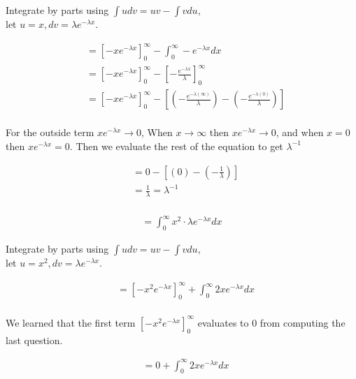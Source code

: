 \documentclass[twocolumn]{article}
\begin{document}
Integrate by parts using $\int udv  = uv - \int vdu$, \\let $u = x, dv=\lambda e^{-\lambda x}$.

\begin{align*}
	&= [-xe^{-\lambda x}]_{0}^{\infty} - \int_{0}^{\infty} -e^{-\lambda x} dx\\
	&= [-xe^{-\lambda x}]_{0}^{\infty} - [-\frac{e^{-\lambda x}}{\lambda} ]^{\infty}_{0}\\
	&= [-xe^{-\lambda x}]_{0}^{\infty} - [(-\frac{e^{-\lambda (\infty)}}{\lambda} ) - (-\frac{e^{-\lambda (0)}}{\lambda})] \\
\end{align*}

For the outside term $xe^{-\lambda x} \to 0$, When $x \to \infty$ then $xe^{-\lambda x} \to 0$, and when $x = 0$ then $x e^{-\lambda x} = 0$. Then we evaluate the rest of the equation to get $\lambda^{-1}$

\begin{align*}
	&= 0 -[(0) - (-\frac{1}{\lambda})] \\
	&= \frac{1}{\lambda} = \lambda^{-1}\\
\end{align*}

\noindent
\vspace{-5pt}

\vspace{-5pt}
\begin{align*}
	= \int_{0}^{\infty} x^2 \cdot \lambda e^{-\lambda x} dx
\end{align*}

\vspace{-5pt}
Integrate by parts using $\int udv  = uv - \int vdu$, \\let $u = x^2, dv=\lambda e^{-\lambda x}$.

\begin{align*}
    &=[-x^2 e^{-\lambda x}]_{0}^{\infty} + \int_{0}^{\infty} 2x e^{-\lambda x}dx\\
\end{align*}

We learned that the first term $[-x^2 e^{-\lambda x}]_{0}^{\infty}$ evaluates to 0 from computing the last question. 

\begin{align*}
	&=0 +\int_{0}^{\infty}2x e^{-\lambda x}dx\\
\end{align*}
\end{document}
